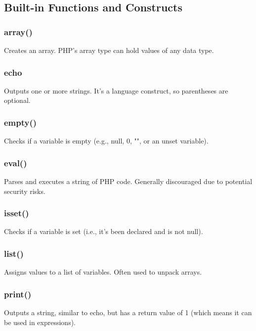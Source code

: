 \documentclass{report}
\begin{document}
    \pagebreak 
    \subsection{Built-in Functions and Constructs}
    \bigbreak \noindent 
    \subsubsection{array()}
    \bigbreak \noindent 
    Creates an array. PHP’s array type can hold values of any data type.

    \bigbreak \noindent 
    \subsubsection{echo}
    \bigbreak \noindent 
    Outputs one or more strings. It’s a language construct, so parentheses are optional.

    \bigbreak \noindent 
    \subsubsection{empty()}
    \bigbreak \noindent 
    Checks if a variable is empty (e.g., null, 0, "", or an unset variable).

    \bigbreak \noindent 
    \subsubsection{eval()}
    \bigbreak \noindent 
    Parses and executes a string of PHP code. Generally discouraged due to potential security risks.

    \bigbreak \noindent 
    \subsubsection{isset()}
    \bigbreak \noindent 
    Checks if a variable is set (i.e., it’s been declared and is not null).

    \bigbreak \noindent 
    \subsubsection{list()}
    \bigbreak \noindent 
    Assigns values to a list of variables. Often used to unpack arrays.

    \bigbreak \noindent 
    \subsubsection{print()}
    \bigbreak \noindent 
    Outputs a string, similar to echo, but has a return value of 1 (which means it can be used in expressions).
\end{document}
